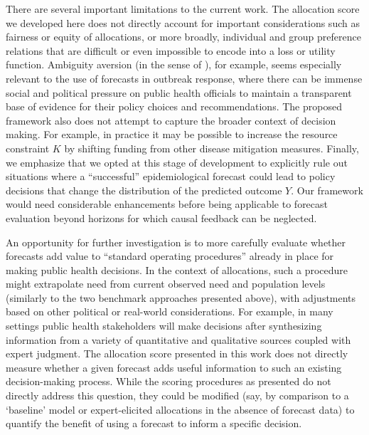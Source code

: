 \documentclass{article}\usepackage[]{graphicx}\usepackage[]{xcolor}
\begin{document}
There are several important limitations to the current work. The allocation score we developed here does not directly
account for important considerations such as fairness or equity of allocations, or more broadly, individual and group
preference relations that are difficult or even impossible to encode into a loss or utility function.  Ambiguity aversion
(in the sense of \cite{ellsberg1961risk}), for example, seems especially relevant to the use of forecasts in outbreak
response, where there can be immense social and political pressure on public health officials to maintain a transparent
base of evidence for their policy choices and recommendations. The proposed framework also does not attempt to capture
the broader context of decision making. For example, in practice it may be possible to increase the resource constraint
$K$ by shifting funding from other disease mitigation measures. Finally, we emphasize that we opted at this stage of
development to explicitly rule out situations where a ``successful''
epidemiological forecast could lead to policy decisions that change the distribution of the predicted outcome $Y$. Our
framework would need considerable enhancements before being applicable to forecast evaluation beyond horizons for which
causal feedback can be neglected.

An opportunity for further investigation is to more carefully evaluate whether forecasts add value to 
``standard operating procedures'' already in place for making public health decisions. In the context of allocations,
such a procedure might extrapolate need from current observed need and population levels (similarly to the two benchmark
approaches presented above), with adjustments based on other political or real-world considerations. For example, in
many settings public health stakeholders will make decisions after synthesizing information from a variety of
quantitative and qualitative sources coupled with expert judgment. The allocation score presented in this work does not
directly measure whether a given forecast adds useful information to such an existing decision-making process. While the
scoring procedures as presented do not directly address this question, they could be modified (say, by comparison to a
`baseline' model or expert-elicited allocations in the absence of forecast data) to quantify the benefit of using a
forecast to inform a specific decision.
\end{document}
